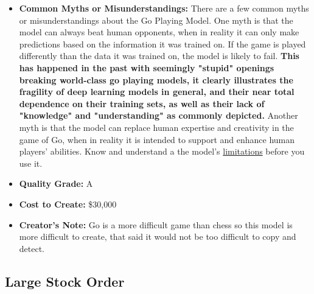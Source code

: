 \begin{itemize}
    \item \textbf{Common Myths or Misunderstandings:} There are a few common myths or misunderstandings about the Go Playing Model. One myth is that the model can always beat human opponents, when in reality it can only make predictions based on the information it was trained on. If the game is played differently than the data it was trained on, the model is likely to fail. \textbf{This has happened in the past with seemingly "stupid" openings breaking world-class go playing models, it clearly illustrates the fragility of deep learning models in general, and their near total dependence on their training sets, as well as their lack of "knowledge" and "understanding" as commonly depicted.} Another myth is that the model can replace human expertise and creativity in the game of Go, when in reality it is intended to support and enhance human players' abilities. Know and understand a the model's \hyperref[sec:limits]{limitations} before you use it.
    \item \textbf{Quality Grade:} A
    \item \textbf{Cost to Create:} \$30,000
    \item \textbf{Creator's Note:} Go is a more difficult game than chess so this model is more difficult to create, that said it would not be too difficult to copy and detect.
\end{itemize}



\subsection{Large Stock Order}

